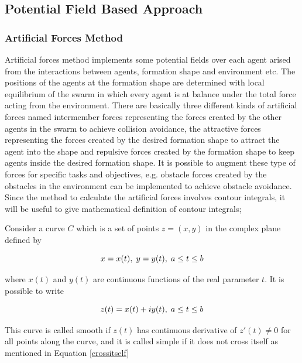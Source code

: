 \subsection{Potential Field Based Approach}

\subsubsection{Artificial Forces Method}
Artificial forces method implements some potential fields over each agent arised from the interactions between agents, formation shape and environment etc. The positions of the agents at the formation shape  are determined with local equilibrium of the swarm in which every agent is at balance under the total force acting from the environment. There are basically three different kinds of artificial forces named intermember forces representing the forces created by the other agents in the swarm to achieve collision avoidance, the attractive forces representing the forces created by the desired formation shape to attract the agent into the shape and repulsive forces created by the formation shape to keep agents inside the desired formation shape. It is possible to augment these type of forces for specific tasks and objectives, e.g. obstacle forces created by the obstacles in the environment can be implemented to achieve obstacle avoidance.
Since the method to calculate the artificial forces involves contour integrals, it will be useful to give mathematical definition of contour integrals;
		
Consider a curve $C$ which is a set of points $z = (x,y)$ in the complex plane defined by

\begin{equation}
x = x(t),   \hspace{0.1cm} y = y(t),  \hspace{0.1cm} a\leq t \leq b
\end{equation}

where $x(t)$ and $y(t)$ are continuous functions of the real parameter $t$.  It is possible to write
		
\begin{equation}
z(t) = x(t)+iy(t),   \hspace{0.1cm} a\leq t \leq b
\end{equation}
		
This curve is called smooth if $z(t)$ has continuous derivative of $z'(t) \neq 0$ for all points along the curve, and it is called simple if it does not cross itself as mentioned in Equation \ref{crossitself}

